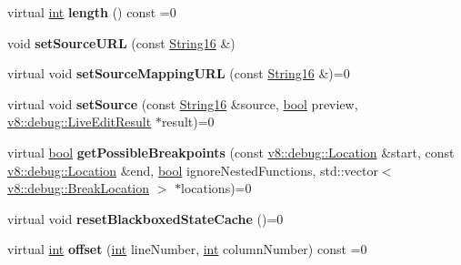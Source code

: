 \begin{DoxyCompactItemize}
virtual \mbox{\hyperlink{classint}{int}} {\bfseries length} () const =0
\item 
\mbox{\label{classv8__inspector_1_1V8DebuggerScript_ad80e71d13ed4aedbc0885b08e90cfb18}} 
void {\bfseries set\+Source\+U\+RL} (const \mbox{\hyperlink{classv8__inspector_1_1String16}{String16}} \&)
\item 
\mbox{\label{classv8__inspector_1_1V8DebuggerScript_ae7feae7061832efe33dbbefb167284dd}} 
virtual void {\bfseries set\+Source\+Mapping\+U\+RL} (const \mbox{\hyperlink{classv8__inspector_1_1String16}{String16}} \&)=0
\item 
\mbox{\label{classv8__inspector_1_1V8DebuggerScript_ad172047d48d77f3a8ad08304087b1c2d}} 
virtual void {\bfseries set\+Source} (const \mbox{\hyperlink{classv8__inspector_1_1String16}{String16}} \&source, \mbox{\hyperlink{classbool}{bool}} preview, \mbox{\hyperlink{structv8_1_1debug_1_1LiveEditResult}{v8\+::debug\+::\+Live\+Edit\+Result}} $\ast$result)=0
\item 
\mbox{\label{classv8__inspector_1_1V8DebuggerScript_ac0dc55917bf1dd04a69e85ba2e7ca245}} 
virtual \mbox{\hyperlink{classbool}{bool}} {\bfseries get\+Possible\+Breakpoints} (const \mbox{\hyperlink{classv8_1_1debug_1_1Location}{v8\+::debug\+::\+Location}} \&start, const \mbox{\hyperlink{classv8_1_1debug_1_1Location}{v8\+::debug\+::\+Location}} \&end, \mbox{\hyperlink{classbool}{bool}} ignore\+Nested\+Functions, std\+::vector$<$ \mbox{\hyperlink{classv8_1_1debug_1_1BreakLocation}{v8\+::debug\+::\+Break\+Location}} $>$ $\ast$locations)=0
\item 
\mbox{\label{classv8__inspector_1_1V8DebuggerScript_ae74a3ac062f928e2eb3da3b9cd4f20a5}} 
virtual void {\bfseries reset\+Blackboxed\+State\+Cache} ()=0
\item 
\mbox{\label{classv8__inspector_1_1V8DebuggerScript_a2df16eb084c948d8d6741b469935292d}} 
virtual \mbox{\hyperlink{classint}{int}} {\bfseries offset} (\mbox{\hyperlink{classint}{int}} line\+Number, \mbox{\hyperlink{classint}{int}} column\+Number) const =0
\item 

\end{DoxyCompactItemize}
